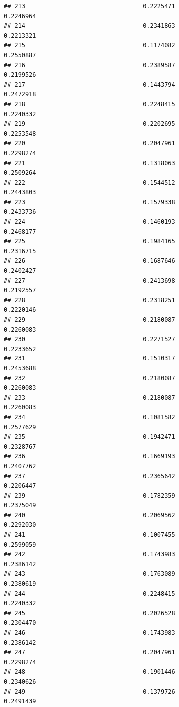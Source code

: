 \documentclass[
  american,
  man,floatsintext]{apa7}
\begin{document}
\begin{verbatim}
## 213                                 0.2225471               0.2246964
## 214                                 0.2341863               0.2213321
## 215                                 0.1174082               0.2550887
## 216                                 0.2389587               0.2199526
## 217                                 0.1443794               0.2472918
## 218                                 0.2248415               0.2240332
## 219                                 0.2202695               0.2253548
## 220                                 0.2047961               0.2298274
## 221                                 0.1318063               0.2509264
## 222                                 0.1544512               0.2443803
## 223                                 0.1579338               0.2433736
## 224                                 0.1460193               0.2468177
## 225                                 0.1984165               0.2316715
## 226                                 0.1687646               0.2402427
## 227                                 0.2413698               0.2192557
## 228                                 0.2318251               0.2220146
## 229                                 0.2180087               0.2260083
## 230                                 0.2271527               0.2233652
## 231                                 0.1510317               0.2453688
## 232                                 0.2180087               0.2260083
## 233                                 0.2180087               0.2260083
## 234                                 0.1081582               0.2577629
## 235                                 0.1942471               0.2328767
## 236                                 0.1669193               0.2407762
## 237                                 0.2365642               0.2206447
## 239                                 0.1782359               0.2375049
## 240                                 0.2069562               0.2292030
## 241                                 0.1007455               0.2599059
## 242                                 0.1743983               0.2386142
## 243                                 0.1763089               0.2380619
## 244                                 0.2248415               0.2240332
## 245                                 0.2026528               0.2304470
## 246                                 0.1743983               0.2386142
## 247                                 0.2047961               0.2298274
## 248                                 0.1901446               0.2340626
## 249                                 0.1379726               0.2491439

\end{verbatim}
\end{document}
